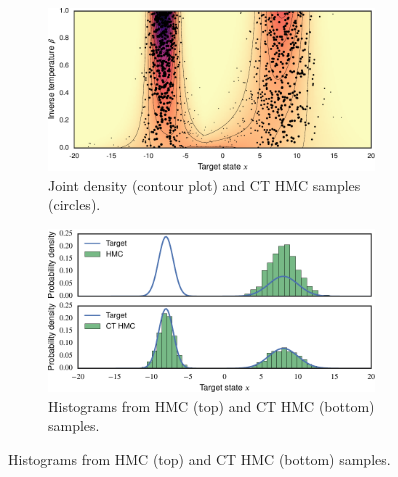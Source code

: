 \begin{figure}[!t]
\begin{subfigure}[b]{.5\linewidth}
\end{subfigure}%
\\
\begin{subfigure}[b]{.5\linewidth}
\vskip 5pt
\centering
\includegraphics[width=0.95\textwidth]{images/continuous-tempering/jct-prob-dens-and-joint-samples}
\caption{Joint density (contour plot) and CT HMC samples (circles).}\label{sfig:jct-prob-dens-and-joint-samples}
\end{subfigure}
\begin{subfigure}[b]{.5\linewidth}
\vskip 5pt
\centering
\includegraphics[width=0.95\textwidth]{images/continuous-tempering/jct-and-hmc-target-histograms}
\caption{Histograms from HMC (top) and CT HMC (bottom) samples.}\label{sfig:jct-and-hmc-target-histograms}
\end{subfigure}

\end{figure}

